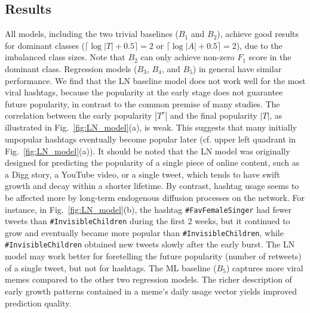 \documentclass[letterpaper]{article}
\begin{document}
\subsection{Results}

All models, including the two trivial baselines ($B_1$ and $B_2$), achieve good results for dominant classes ($\lceil \log |T| + 0.5 \rceil =2$ or $\lceil \log |A| + 0.5 \rceil = 2$), due to the imbalanced class sizes. Note that $B_2$ can only achieve non-zero $F_1$ score in the dominant class. 
Regression models ($B_3$, $B_4$, and $B_5$) in general have similar performance.
We find that the LN baseline model does not work well for the most viral hashtags, because the popularity at the early stage does not guarantee future popularity, in contrast to the common premise of many studies. The correlation between the early popularity $|T^{\tau}|$ and the final popularity $|T|$, as illustrated in Fig.~\ref{fig:LN_model}(a), is weak. This suggests that many initially unpopular hashtags eventually become popular later (cf. upper left quadrant in Fig.~\ref{fig:LN_model}(a)). 
It should be noted that the LN model was originally designed for predicting the popularity of a single piece of online content, such as a Digg story, a YouTube video, or a single tweet, which tends to have swift growth and decay within a shorter lifetime. By contrast, hashtag usage seems to be affected more by long-term endogenous diffusion processes on the network. For instance, in Fig.~\ref{fig:LN_model}(b), the hashtag \texttt{\#FavFemaleSinger} had fewer tweets than \texttt{\#InvisibleChildren} during the first 2 weeks, but it continued to grow and eventually became more popular than \texttt{\#InvisibleChildren}, while \texttt{\#InvisibleChildren} obtained new tweets slowly after the early burst. The LN model may work better for foretelling the future popularity (number of retweets) of a single tweet, but not for hashtags.
The ML baseline ($B_5$) captures more viral memes compared to the other two regression models. The richer description of early growth patterns contained in a meme's daily usage vector yields improved  prediction quality.
\end{document}
